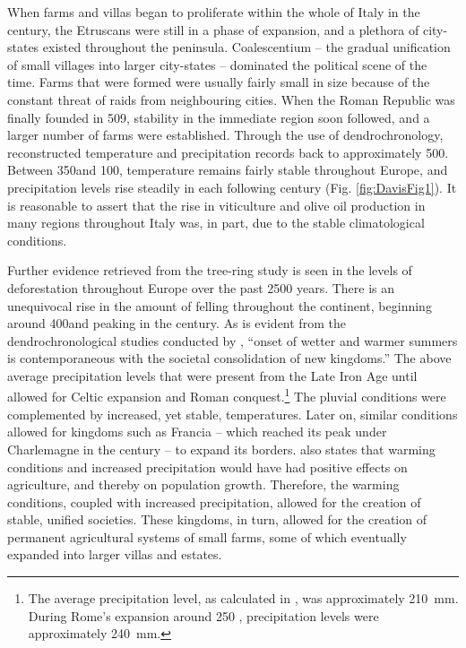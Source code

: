 When farms and villas began to proliferate within the whole of Italy in the  century\BC, the Etruscans were still in a phase of expansion, and a plethora of city-states existed throughout the peninsula. Coalescentium – the gradual unification of small villages into larger city-states – dominated the political scene of the time. Farms that were formed were usually fairly small in size because of the constant threat of raids from neighbouring cities. When the Roman Republic was finally founded in 509\BC, stability in the immediate region soon followed, and a larger number of farms were established. Through the use of dendrochronology, \textcite{Büntgen_2011a} reconstructed temperature and precipitation records back to approximately 500\BC. Between 350\BC and 100\BC, temperature remains fairly stable throughout Europe, and precipitation levels rise steadily in each following century (Fig. \ref{fig:DavisFig1}). It is reasonable to assert that the rise in viticulture and olive oil production in many regions throughout Italy was, in part, due to the stable climatological conditions.
	


Further evidence retrieved from the tree-ring study is seen in the levels of deforestation throughout Europe over the past 2500 years. There is an unequivocal rise in the amount of felling throughout the continent, beginning around 400\BC and peaking in the  century\BC. As is evident from the dendrochronological studies conducted by \textcite[580]{Büntgen_2011a}, “onset of wetter and warmer summers is contemporaneous with the societal consolidation of new kingdoms.” The above average precipitation levels that were present from the Late Iron Age until  allowed for Celtic expansion and Roman conquest.\footnote{The average precipitation level, as calculated in \textcite{Büntgen_2011b}, 
was approximately \SI{210}{\milli\metre}. During Rome’s expansion around 250 \BC, 
precipitation levels were approximately \SI{240}{\milli\metre}.} The pluvial conditions were complemented by increased, yet stable, temperatures. Later on, similar conditions allowed for kingdoms such as Francia -- which reached its peak under Charlemagne in the  century – to expand its borders. \textcite[12]{Scheidel_2012} also states that warming conditions and increased precipitation would have had positive effects on agriculture, and thereby on population growth. Therefore, the warming conditions, coupled with increased precipitation, allowed for the creation of stable, unified societies. These kingdoms, in turn, allowed for the creation of permanent agricultural systems of small farms, some of which eventually expanded into larger villas and estates. 

